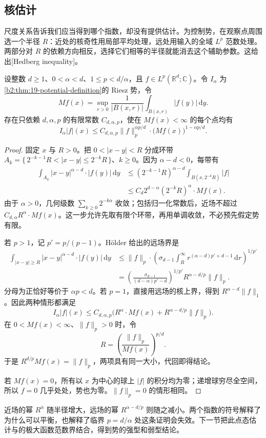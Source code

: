 \subsection{核估计}
\label{b2:subsec:190103}

尺度关系告诉我们应当得到哪个指数，却没有提供估计。为控制势，在观察点周围选一个半径 \(R\)：近处的核奇性用局部平均处理，远处用输入的全域 \(L^p\) 范数处理。两部分对 \(R\) 的依赖方向相反，选择它们相等的半径就能消去这个辅助参数。这给出[Hedberg inequality]。
\begin{lemma}[Hedberg 估计]\label{b2:thm:19-hedberg}
设整数 \(d\geq1\)、\(0<\alpha<d\)、\(1\leq p<d/\alpha\)，且 \(f\in L^p(\mathbb R^d;\mathbb C)\)。令 \(I_\alpha\) 为\cref{b2:thm:19-potential-definition}的 Riesz 势，令
\[
 Mf(x)=\sup_{r>0}\frac1{|B(x,r)|}\int_{B(x,r)}|f(y)|\,\mathrm dy.
\]
存在只依赖 \(d,\alpha,p\) 的有限常数 \(C_{d,\alpha,p}\)，使在 \(Mf(x)<\infty\) 的每个点均有
\[
 I_\alpha|f|(x)
 \leq C_{d,\alpha,p}\|f\|_p^{\alpha p/d}\cdot
       \bigl(Mf(x)\bigr)^{1-\alpha p/d}.
\]
\end{lemma}
\begin{proof}
固定 \(x\) 与 \(R>0\)。把 \(0<|x-y|<R\) 分成环带
\(A_k=\{\,2^{-k-1}R<|x-y|\leq2^{-k}R\,\}\)、\(k\geq0\)。因为 \(\alpha-d<0\)，每带有
\[
 \begin{aligned}
 \int_{A_k}|x-y|^{\alpha-d}\cdot|f(y)|\,\mathrm dy
 &\leq(2^{-k-1}R)^{\alpha-d}
       \int_{B(x,2^{-k}R)}|f|\\
 &\leq C_d2^{d-\alpha}(2^{-k}R)^\alpha\cdot Mf(x).
 \end{aligned}
\]
由于 \(\alpha>0\)，几何级数 \(\sum_{k\geq0}2^{-k\alpha}\) 收敛；包括归一化常数后，近场不超过 \(C_{d,\alpha}R^\alpha\cdot Mf(x)\)。这一步允许先取有限个环带，再用单调收敛，不必预先假定势有限。

若 \(p>1\)，记 \(p'=p/(p-1)\)。Hölder 给出的远场界是
\[
 \begin{aligned}
 \int_{|x-y|\geq R}|x-y|^{\alpha-d}\cdot|f(y)|\,\mathrm dy
 &\leq\|f\|_p\cdot
 \left(\sigma_{d-1}\int_R^\infty
        r^{(\alpha-d)p'+d-1}\,\mathrm dr\right)^{1/p'}\\
 &=\left(\frac{\sigma_{d-1}}{(d-\alpha)p'-d}\right)^{1/p'}
       R^{\alpha-d/p}\|f\|_p.
 \end{aligned}
\]
分母为正恰好等价于 \(\alpha p<d\)。若 \(p=1\)，直接用远场的核上界，得到 \(R^{\alpha-d}\|f\|_1\)。因此两种情形都满足
\[
 I_\alpha|f|(x)
 \leq C_{d,\alpha,p}
 \bigl(R^\alpha\cdot Mf(x)+R^{\alpha-d/p}\|f\|_p\bigr).
\]
在 \(0<Mf(x)<\infty\)、\(\|f\|_p>0\) 时，令
\[
 R=\left(\frac{\|f\|_p}{Mf(x)}\right)^{p/d}.
\]
于是 \(R^{d/p}Mf(x)=\|f\|_p\)，两项具有同一大小，代回即得结论。

若 \(Mf(x)=0\)，所有以 \(x\) 为中心的球上 \(|f|\) 的积分均为零；递增球穷尽全空间，所以 \(f=0\) 几乎处处，势也为零。\(\|f\|_p=0\) 的情形相同。
\end{proof}
近场的幂 \(R^\alpha\) 随半径增大，远场的幂 \(R^{\alpha-d/p}\) 则随之减小。两个指数的符号解释了为什么可以平衡，也解释了临界 \(p=d/\alpha\) 处这条证明会失效。下一节把此点态估计与的极大函数范数界结合，得到势的强型和弱型结论。
